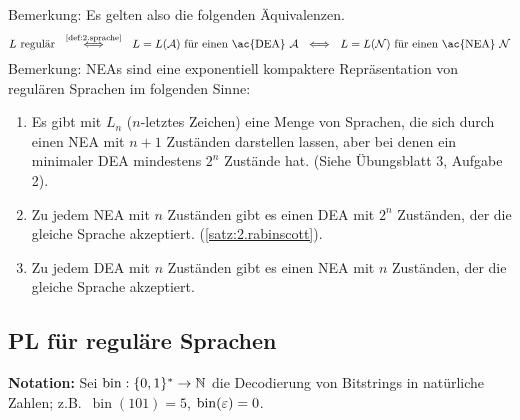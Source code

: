 Bemerkung: Es gelten also die folgenden Äquivalenzen.
\[
L \text{ regulär} 
\ \ \stackrel{\text{\autoref{def:2.sprache}}}{\Longleftrightarrow} \ \ L = L(\A) \text{ für einen \ac{DEA} }\A
\ \ \Longleftrightarrow \ \ L = L(\calN) \text{ für einen \ac{NEA} }\calN
\]
Bemerkung: \ac{NEA}s sind eine exponentiell kompaktere Repräsentation von regulären Sprachen im folgenden Sinne:
\begin{enumerate}
 \item Es gibt mit $L_n$ ($n$-letztes Zeichen) eine Menge von Sprachen, die sich durch einen \ac{NEA} mit $n+1$ Zuständen darstellen lassen, aber bei denen ein minimaler \ac{DEA} mindestens $2^n$ Zustände hat. (Siehe Übungsblatt 3, Aufgabe 2).
 \item Zu jedem \ac{NEA} mit $n$ Zuständen gibt es einen \ac{DEA} mit $2^n$ Zuständen, der die gleiche Sprache akzeptiert. (\autoref{satz:2.rabinscott}).
 \item Zu jedem \ac{DEA} mit $n$ Zuständen gibt es einen \ac{NEA} mit $n$ Zuständen, der die gleiche Sprache akzeptiert.
\end{enumerate}



\subsection{\acf{PL} für reguläre Sprachen} %
\label{sec:regpl}

\textbf{Notation:} Sei $\operatorname{bin}:\{0,1\}^*\rightarrow \mathbb{N}$ die Decodierung von Bitstrings in natürliche Zahlen;
z.B.\ $\operatorname{bin}(101) = 5$, $\operatorname{bin}(\varepsilon) = 0$.

